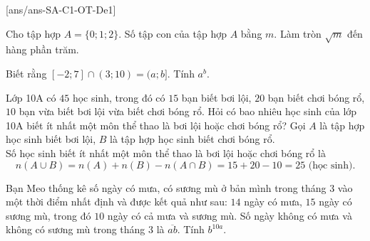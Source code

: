 \TNSA
\setcounter{ex}{0}
[ans/ans-SA-C1-OT-De1]

\begin{ex}%
	Cho tập hợp $A=\{0;1;2\}$. Số tập con của tập hợp $A$ bằng $m$. Làm tròn $\sqrt{m}$ đến hàng phần trăm.
\end{ex}
\begin{ex}%
	Biết rằng  $[-2;7]\cap(3;10)=(a;b]$. Tính $a^b$.
	\loigiai{
		Ta có $[-2;7]\cap(3;10)=(3;7]$. Vậy $a^b=3^7=2187$.
	}
\end{ex}

\begin{ex}%
	Lớp 10A có $45$ học sinh, trong đó có $15$ bạn biết bơi lội, $20$ bạn biết chơi bóng rổ, $10$ bạn vừa biết bơi lội vừa biết chơi bóng rổ. Hỏi có bao nhiêu học sinh của lớp 10A biết ít nhất một môn thể thao là bơi lội hoặc chơi bóng rổ?
	\loigiai
	{
		Gọi $A$ là tập hợp học sinh biết bơi lội, $B$ là tập hợp học sinh biết chơi bóng rổ.\\
		Số học sinh biết ít nhất một môn thể thao là bơi lội hoặc chơi bóng rổ là
		\[n(A\cup B)=n(A)+n(B)-n(A\cap B)=15+20-10=25\text{ (học sinh)}. \]
	}
\end{ex}

\begin{ex}
	Bạn Meo thống kê số ngày có mưa, có sương mù ở bản mình trong tháng $3$ vào một thời điểm nhất định và được kết quả như sau: $14$ ngày có mưa, $15$ ngày có sương mù, trong đó $10$ ngày có cả mưa và sương mù. Số ngày không có mưa và không có sương mù trong tháng $3$ là $\overline{ab}$. Tính $b^{10a}$.
\end{ex}

